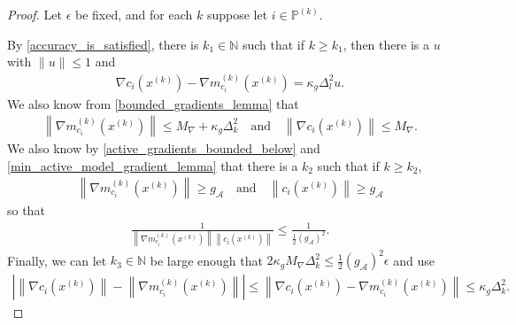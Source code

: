 \documentclass{article}
\theoremstyle{case}
\numberwithin{theorem}{subsection}
\newcommand{\dk}{\Delta_k}
\newcommand{\gmcik}{{\nabla m_{c_i}^{(k)}\left(\xk\right)}}
\newcommand{\maxgrad}{{M_{\nabla}}}
\newcommand{\minactivegrad}{{ g_{\mathcal A} }}
\newcommand{\naturals}{\mathbb N}
\newcommand{\xk}{{x^{(k)}}}
\newcommand{\activeprojk}{{\mathbb P^{(k)}}}
\begin{document}
\begin{proof}
Let $\epsilon$ be fixed, and for each $k$ suppose let $i \in \activeprojk$.

By \cref{accuracy_is_satisfied}, there is $k_1 \in \naturals$ such that if $k \ge k_1$, then there is a $u$ with $\|u\| \le 1$ and
\begin{align*}
\nabla c_i\left( \xk \right) - \gmcik = \kappa_g \Delta_{l}^2 u.
\end{align*}
We also know from \cref{bounded_gradients_lemma} that
\begin{align*}
\left\|\gmcik\right\| \le \maxgrad + \kappa_g \dk^2 \quad \textrm{and} \quad \left\|\nabla c_i(\xk) \right\| \le \maxgrad.
\end{align*}
We also know by \cref{active_gradients_bounded_below} and \cref{min_active_model_gradient_lemma} that there is a $k_2$ such that if $k \ge k_2$,
\begin{align*}
\left\|\gmcik \right\| \ge \minactivegrad \quad \textrm{and} \quad \left\|c_i\left(\xk\right)\right\| \ge \minactivegrad
\end{align*}
so that
\begin{align}
\frac {1} {\left\|\gmcik \right\|  \left\|c_i\left(\xk\right)\right\|  } \le \frac 1 {\frac 1 2 \left(\minactivegrad\right)^2}. \label{zikac_what_i_need_to_multiply}
\end{align}
Finally, we can let $k_3 \in \naturals$ be large enough that $2 \kappa_g\maxgrad \dk^2 \le \frac 1 2 \left(\minactivegrad\right)^2\epsilon$ and use
\begin{align}
\left|\left\|\nabla c_i\left(\xk \right)\right\|  - \left\|\gmcik\right\|\right| \le \left\|\nabla c_i\left( \xk \right) - \gmcik\right\| \le \kappa_g \dk^2 \label{zikac_asdfasdffdsafdsa}.
\end{align}

\end{proof}
\end{document}
